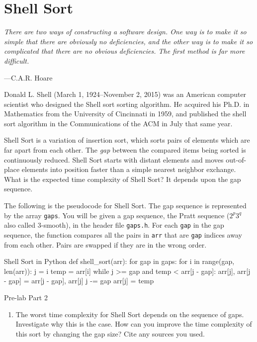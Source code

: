 \documentclass[11pt]{article}
\begin{document}
\section{Shell Sort}

\epigraph{\emph{There are two ways of constructing a software design.
    One way is to make it so simple that there are obviously no
    deficiencies, and the other way is to make it so complicated that
    there are no obvious deficiencies. The first method is far more
difficult.}}{---C.A.R. Hoare}

\noindent
Donald L. Shell (March 1, 1924--November 2, 2015) was an American
computer scientist who designed the Shell sort sorting algorithm.
He acquired his Ph.D. in Mathematics from the University of Cincinnati
in 1959, and published the shell sort algorithm in the Communications
of the ACM in July that same year.

Shell Sort is a variation of insertion sort, which sorts pairs of
elements which are far apart from each other. The \emph{gap} between the
compared items being sorted is continuously reduced. Shell Sort starts
with distant elements and moves out-of-place elements into position
faster than a simple nearest neighbor exchange. What is the expected
time complexity of Shell Sort? It depends upon the gap sequence.

The following is the pseudocode for Shell Sort. The gap sequence is
represented by the array \texttt{gaps}. You will be given a gap
sequence, the Pratt sequence ($2^p 3^q$ also called $3$-smooth), in the header file \texttt{gaps.h}.
For each \texttt{gap} in the gap sequence, the function compares all the
pairs in \texttt{arr} that are \texttt{gap} indices away from each
other. Pairs are swapped if they are in the wrong order.

\begin{pythonlisting}{Shell Sort in Python}
def shell_sort(arr):
    for gap in gaps:
        for i in range(gap, len(arr)):
            j = i
            temp = arr[i]
            while j >= gap and temp < arr[j - gap]:
                arr[j], arr[j - gap] = arr[j - gap], arr[j]
                j -= gap
            arr[j] = temp
\end{pythonlisting}

\medskip
\begin{prelab}{Pre-lab Part 2}
  \begin{enumerate}
    \item The worst time complexity for Shell Sort depends on the
      sequence of gaps. Investigate why this is the case. How can you
      improve the time complexity of this sort by changing the gap size?
      Cite any sources you used.
  \end{enumerate}
\end{prelab}
\end{document}
